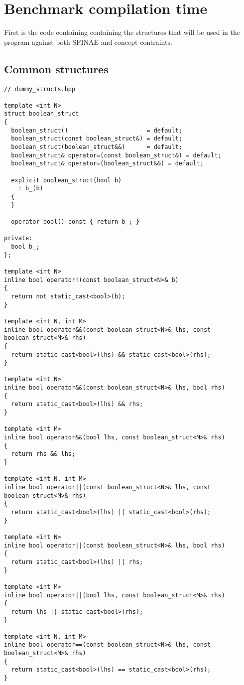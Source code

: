 \chapter{Benchmark compilation time}
\label{appendix:benchmark.compilation.time}

First is the code containing containing the structures that will be used in the program against both SFINAE and concept
contraints.
\section{Common structures}
\begin{verbatim}
// dummy_structs.hpp

template <int N>
struct boolean_struct
{
  boolean_struct()                      = default;
  boolean_struct(const boolean_struct&) = default;
  boolean_struct(boolean_struct&&)      = default;
  boolean_struct& operator=(const boolean_struct&) = default;
  boolean_struct& operator=(boolean_struct&&) = default;

  explicit boolean_struct(bool b)
    : b_(b)
  {
  }

  operator bool() const { return b_; }

private:
  bool b_;
};

template <int N>
inline bool operator!(const boolean_struct<N>& b)
{
  return not static_cast<bool>(b);
}

template <int N, int M>
inline bool operator&&(const boolean_struct<N>& lhs, const boolean_struct<M>& rhs)
{
  return static_cast<bool>(lhs) && static_cast<bool>(rhs);
}

template <int N>
inline bool operator&&(const boolean_struct<N>& lhs, bool rhs)
{
  return static_cast<bool>(lhs) && rhs;
}

template <int M>
inline bool operator&&(bool lhs, const boolean_struct<M>& rhs)
{
  return rhs && lhs;
}

template <int N, int M>
inline bool operator||(const boolean_struct<N>& lhs, const boolean_struct<M>& rhs)
{
  return static_cast<bool>(lhs) || static_cast<bool>(rhs);
}

template <int N>
inline bool operator||(const boolean_struct<N>& lhs, bool rhs)
{
  return static_cast<bool>(lhs) || rhs;
}

template <int M>
inline bool operator||(bool lhs, const boolean_struct<M>& rhs)
{
  return lhs || static_cast<bool>(rhs);
}

template <int N, int M>
inline bool operator==(const boolean_struct<N>& lhs, const boolean_struct<M>& rhs)
{
  return static_cast<bool>(lhs) == static_cast<bool>(rhs);
}


\end{verbatim}
